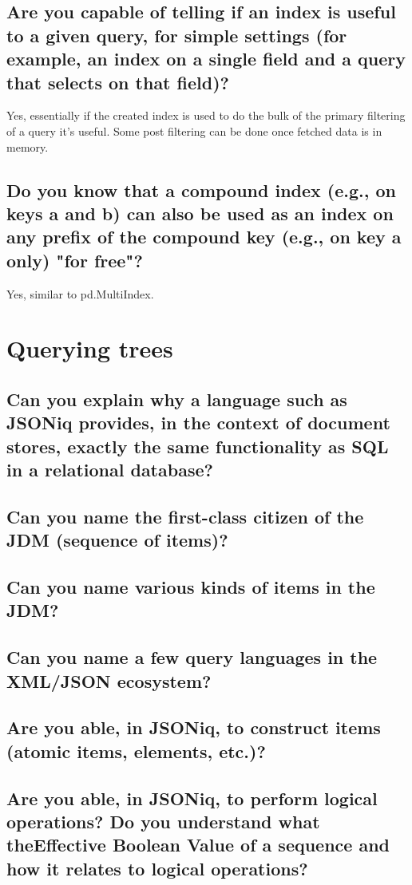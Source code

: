 \documentclass{article}
\begin{document}
\subsection{Are you capable of telling if an index is useful to a given query, for simple settings (for example, an index on a single field and a query that selects on that field)?}

Yes, essentially if the created index is used to do the bulk of the primary filtering of a query it's useful. Some post filtering can be done once fetched data is in memory.

\subsection{Do you know that a compound index (e.g., on keys a and b) can also be used as an index on any prefix of the compound key (e.g., on key a only) "for free"?}

Yes, similar to pd.MultiIndex.

\pagebreak

\section{Querying trees}
\subsection{Can you explain why a language such as JSONiq provides, in the context of document stores, exactly the same functionality as SQL in a relational database?}
\subsection{Can you name the first-class citizen of the JDM (sequence of items)?}
\subsection{Can you name various kinds of items in the JDM?}
\subsection{Can you name a few query languages in the XML/JSON ecosystem?}
\subsection{Are you able, in JSONiq, to construct items (atomic items, elements, etc.)?}
\subsection{Are you able, in JSONiq, to perform logical operations? Do you understand what theEffective Boolean Value of a sequence and how it relates to logical operations?}
\end{document}
